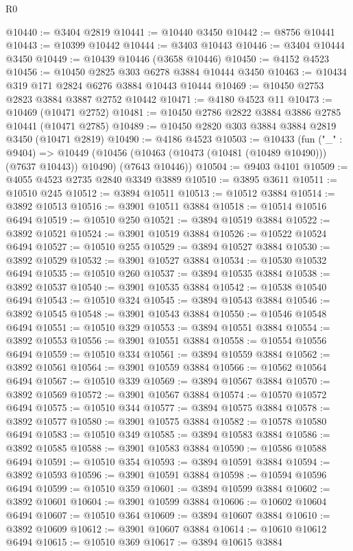 \begin{lexlean}{R0}
\begin{coremodule}
@10440 := @3404 @2819
@10441 := @10440 @3450
@10442 := @8756 @10441
@10443 := @10399 @10442
@10444 := @3403 @10443
@10446 := @3404 @10444 @3450
@10449 := @10439 @10446 (@3658 @10446)
@10450 := @4152 @4523
@10456 := @10450 @2825 @303 @6278 @3884 @10444 @3450
@10463 := @10434 @319 @171 @2824 @6276 @3884 @10443 @10444
@10469 := @10450 @2753 @2823 @3884 @3887 @2752 @10442
@10471 := @4180 @4523 @11
@10473 := @10469 (@10471 @2752)
@10481 := @10450 @2786 @2822 @3884 @3886 @2785 @10441 (@10471 @2785)
@10489 := @10450 @2820 @303 @3884 @3884 @2819 @3450 (@10471 @2819)
@10490 := @4186 @4523
@10503 := @10433
    (fun ("_" : @9404) =>
    @10449 (@10456 (@10463 (@10473 (@10481 (@10489 @10490))) (@7637 @10443)) @10490) (@7643 @10446))
@10504 := @9403 @4101
@10509 := @4055 @4523 @2735 @2840 @3349 @3889
@10510 := @3895 @3611
@10511 := @10510 @245
@10512 := @3894 @10511
@10513 := @10512 @3884
@10514 := @3892 @10513
@10516 := @3901 @10511 @3884
@10518 := @10514 @10516 @6494
@10519 := @10510 @250
@10521 := @3894 @10519 @3884
@10522 := @3892 @10521
@10524 := @3901 @10519 @3884
@10526 := @10522 @10524 @6494
@10527 := @10510 @255
@10529 := @3894 @10527 @3884
@10530 := @3892 @10529
@10532 := @3901 @10527 @3884
@10534 := @10530 @10532 @6494
@10535 := @10510 @260
@10537 := @3894 @10535 @3884
@10538 := @3892 @10537
@10540 := @3901 @10535 @3884
@10542 := @10538 @10540 @6494
@10543 := @10510 @324
@10545 := @3894 @10543 @3884
@10546 := @3892 @10545
@10548 := @3901 @10543 @3884
@10550 := @10546 @10548 @6494
@10551 := @10510 @329
@10553 := @3894 @10551 @3884
@10554 := @3892 @10553
@10556 := @3901 @10551 @3884
@10558 := @10554 @10556 @6494
@10559 := @10510 @334
@10561 := @3894 @10559 @3884
@10562 := @3892 @10561
@10564 := @3901 @10559 @3884
@10566 := @10562 @10564 @6494
@10567 := @10510 @339
@10569 := @3894 @10567 @3884
@10570 := @3892 @10569
@10572 := @3901 @10567 @3884
@10574 := @10570 @10572 @6494
@10575 := @10510 @344
@10577 := @3894 @10575 @3884
@10578 := @3892 @10577
@10580 := @3901 @10575 @3884
@10582 := @10578 @10580 @6494
@10583 := @10510 @349
@10585 := @3894 @10583 @3884
@10586 := @3892 @10585
@10588 := @3901 @10583 @3884
@10590 := @10586 @10588 @6494
@10591 := @10510 @354
@10593 := @3894 @10591 @3884
@10594 := @3892 @10593
@10596 := @3901 @10591 @3884
@10598 := @10594 @10596 @6494
@10599 := @10510 @359
@10601 := @3894 @10599 @3884
@10602 := @3892 @10601
@10604 := @3901 @10599 @3884
@10606 := @10602 @10604 @6494
@10607 := @10510 @364
@10609 := @3894 @10607 @3884
@10610 := @3892 @10609
@10612 := @3901 @10607 @3884
@10614 := @10610 @10612 @6494
@10615 := @10510 @369
@10617 := @3894 @10615 @3884

\end{coremodule}
\end{lexlean}
